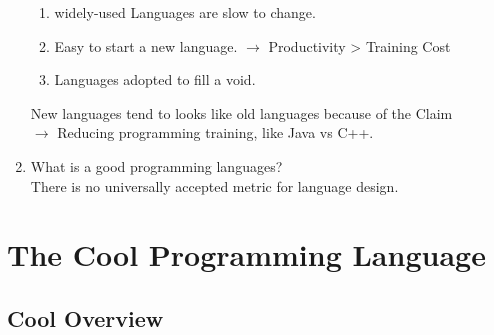 \documentclass{report}
\begin{document}
\begin{enumerate}
        \begin{enumerate}
            \item widely-used Languages are slow to change.
            \item Easy to start a new language. \(\longrightarrow\) Productivity > Training Cost
            \item Languages adopted to fill a void.
        \end{enumerate}
        \begin{flushleft}
            New languages tend to looks like old languages because of the Claim\\
            \(\rightarrow\) Reducing programming training, like Java vs C++.
        \end{flushleft}
        \item What is a good programming languages?\\
        \textcolor{stanfordred}{There is no universally accepted metric for language design. }
    \end{enumerate}

    \newpage
    \chapter{The Cool Programming Language}
    \section{Cool Overview}
    
\end{document}
